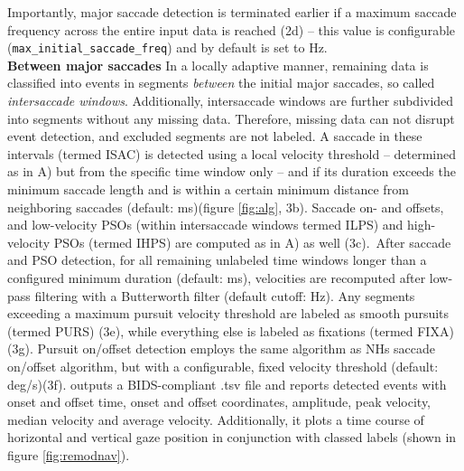  Importantly, major saccade detection is terminated earlier if a maximum saccade frequency across the entire input data is reached (2d) -- this value is configurable (\texttt{max\_initial\_saccade\_freq}) and by default is set to \unit[2]{Hz}. \\
 
 \textbf{Between major saccades} In a locally adaptive manner, remaining data is classified into events in segments \textit{between} the initial major saccades, so called \textit{intersaccade windows}. Additionally, intersaccade windows are further subdivided into segments without any missing data. Therefore, missing data can not disrupt event detection, and excluded segments are not labeled. A saccade in these intervals (termed ISAC) is detected using a local velocity threshold -- determined as in A) but from the specific time window only -- and if its duration exceeds the minimum saccade length and is within a certain minimum distance from neighboring saccades (default: \unit[130]{ms})(figure \ref{fig:alg}, 3b). Saccade on- and offsets, and low-velocity PSOs (within intersaccade windows termed ILPS) and high-velocity PSOs (termed IHPS) are computed as in A) as well (3c).\
 After saccade and PSO detection, for all remaining unlabeled time windows longer than a configured minimum duration (default: \unit[40]{ms}), velocities are recomputed after low-pass filtering with a Butterworth filter (default cutoff: \unit[4]{Hz}). Any segments exceeding a maximum pursuit velocity threshold are labeled as smooth pursuits (termed PURS) (3e), while everything else is labeled as fixations (termed FIXA)(3g). Pursuit on/offset detection employs the same algorithm as NHs saccade on/offset algorithm, but with a configurable, fixed velocity threshold (default: \unit[2]{deg/s})(3f). \remodnav outputs a BIDS-compliant \citep{gorgolewski2016brain} .tsv file and reports detected events with onset and offset time, onset and offset coordinates, amplitude, peak velocity, median velocity and average velocity. Additionally, it plots a time course of horizontal and vertical gaze position in conjunction with classed labels (shown in figure \ref{fig:remodnav}).
   




